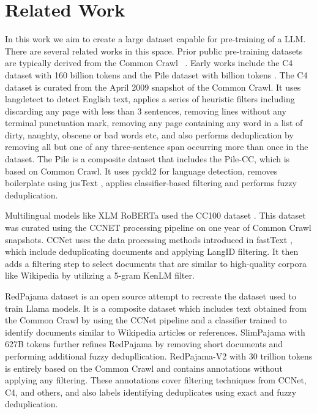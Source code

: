 \section{Related Work}
\label{relatedwork}


In this work we aim to create a large dataset capable for pre-training of a LLM. There are several related works in this space. Prior public pre-training datasets are typically derived from the Common Crawl ~\cite{commoncrawl}. Early works include the C4 dataset with 160 billion tokens \cite{raffel2020exploring} and the Pile dataset with billion tokens \cite{gao2020pile}. The C4 dataset is curated from the April 2009 snapshot of the Common Crawl. It uses langdetect \cite{langdetect} to detect English text, applies a series of heuristic filters including discarding any page with less than 3 sentences, removing lines without any terminal punctuation mark, removing any page containing any word in a list of dirty, naughty, obscene or bad words etc, and also performs deduplication by removing all but one of any three-sentence span occurring more than once in the dataset. The Pile is a composite dataset that includes the Pile-CC, which is based on Common Crawl. It uses pycld2 \citep{pycld2} for language detection, removes boilerplate using jusText \citep{justext}, applies classifier-based filtering and performs fuzzy deduplication. 

Multilingual models like XLM RoBERTa \cite{XLMRoBERTa} used the CC100 dataset \cite{conneu2019cc100}. This dataset was curated using the CCNET \cite{wenzek2019ccnet} processing pipeline on one year of Common Crawl snapshots. CCNet uses the data processing methods introduced in fastText \cite{joulin2017bag}, which include deduplicating documents and applying LangID filtering. It then adds a filtering step to select documents that are similar to high-quality corpora like Wikipedia by utilizing a 5-gram KenLM filter.

RedPajama dataset \cite{weber2024redpajama} is an open source attempt to recreate the dataset used to train Llama models. It is a composite dataset which includes text obtained from the Common Crawl by using the CCNet pipeline \cite{wenzek2019ccnet} and a classifier trained to identify documents similar to Wikipedia articles or references. SlimPajama with 627B tokens \cite{cerebras2023slimpajama} further refines RedPajama by removing short documents and performing additional fuzzy dedupllication. RedPajama-V2 \cite{weber2024redpajama} with 30 trillion tokens is entirely based on the Common Crawl and contains annotations without applying any filtering. These annotations cover filtering techniques from CCNet, C4, and others, and also labels identifying deduplicates using exact and fuzzy deduplication. 

